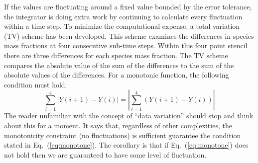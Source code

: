 If the values are fluctuating around a fixed value bounded by the error tolerance, the integrator is doing extra work by continuing to calculate every fluctuation within a time step. To minimize the computational expense, a total variation (TV) scheme has been developed. This scheme examines the differences in species mass fractions at four consecutive sub-time steps. Within this four point stencil there are three differences for each species mass fraction. The TV scheme compares the absolute value of the sum of the differences to the sum of the absolute values of the differences.  For a monotonic function, the following condition must hold:
\begin{equation}\label{eq:monotone}
\sum_{i=1}^{4}|Y(i+1)-Y(i)| = |\sum_{i=1}^{4}(Y(i+1)-Y(i))|
\end{equation}
The reader unfamiliar with the concept of ``data variation'' should stop and think about this for a moment.  It says that, regardless of other complexities, the monotonicity constraint (no fluctuations) is sufficient guarantee the condition stated in Eq.~(\ref{eq:monotone}).  The corollary is that if Eq.~(\ref{eq:monotone}) does not hold then we are guaranteed to have some level of fluctuation.

